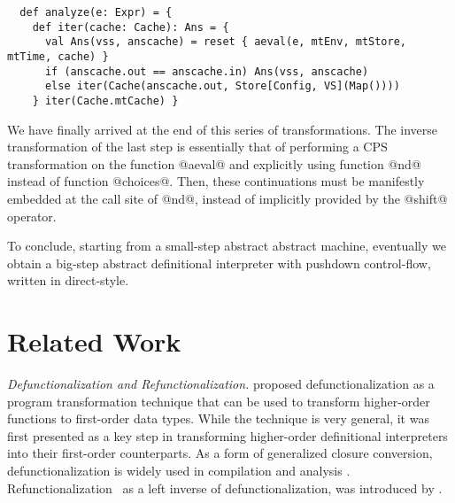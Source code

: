 \documentclass[acmsmall, screen]{acmart}\settopmatter{}
\begin{document}
\begin{lstlisting}
  def analyze(e: Expr) = {
    def iter(cache: Cache): Ans = {
      val Ans(vss, anscache) = reset { aeval(e, mtEnv, mtStore, mtTime, cache) }
      if (anscache.out == anscache.in) Ans(vss, anscache)
      else iter(Cache(anscache.out, Store[Config, VS](Map())))
    } iter(Cache.mtCache) }
\end{lstlisting}

We have finally arrived at the end of this series of transformations.
The inverse transformation of the last step is essentially that of performing a CPS transformation on the function @aeval@ and
explicitly using function @nd@ instead of function @choices@. Then, these continuations must be
manifestly embedded at the call site of @nd@, instead of implicitly provided by the @shift@ operator.

To conclude, starting from a small-step abstract abstract machine, eventually we obtain a
big-step abstract definitional interpreter with pushdown control-flow, written in direct-style.


\section{Related Work}\label{sec:related}

\textit{Defunctionalization and Refunctionalization.}
\citet{Reynolds:72} proposed defunctionalization as a program transformation
technique that can be used to transform higher-order functions to first-order data types.
While the technique is very general, it was first presented as a key step in
transforming higher-order definitional interpreters into their first-order
counterparts.
As a form of generalized closure conversion,
defunctionalization is widely used in compilation and analysis \cite{pottier2006polymorphic,
Eisenberg:2014:PFT:2633357.2633361, fourtounis2014modular, 10.1007/3-540-46425-5_4, consel1993tour}.
Refunctionalization~\cite{Danvy:2006:RW:2171265.2171268} as a
left inverse of defunctionalization, was introduced
by \citeauthor{Danvy:2006:RW:2171265.2171268,DANVY2009534}.
\end{document}
